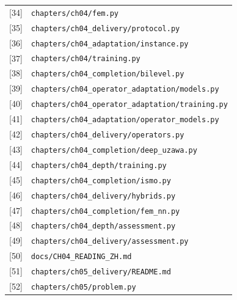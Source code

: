 \documentclass[a4paper,10pt]{article}
\begin{document}
\begin{longtable}{>{\raggedright\arraybackslash}p{}>{\raggedright\arraybackslash}p{}}
\leavevmode\hypertarget{source-34}{[34]} & \nolinkurl{chapters/ch04/fem.py} \\[2pt]
\leavevmode\hypertarget{source-35}{[35]} & \nolinkurl{chapters/ch04_delivery/protocol.py} \\[2pt]
\leavevmode\hypertarget{source-36}{[36]} & \nolinkurl{chapters/ch04_adaptation/instance.py} \\[2pt]
\leavevmode\hypertarget{source-37}{[37]} & \nolinkurl{chapters/ch04/training.py} \\[2pt]
\leavevmode\hypertarget{source-38}{[38]} & \nolinkurl{chapters/ch04_completion/bilevel.py} \\[2pt]
\leavevmode\hypertarget{source-39}{[39]} & \nolinkurl{chapters/ch04_operator_adaptation/models.py} \\[2pt]
\leavevmode\hypertarget{source-40}{[40]} & \nolinkurl{chapters/ch04_operator_adaptation/training.py} \\[2pt]
\leavevmode\hypertarget{source-41}{[41]} & \nolinkurl{chapters/ch04_adaptation/operator_models.py} \\[2pt]
\leavevmode\hypertarget{source-42}{[42]} & \nolinkurl{chapters/ch04_delivery/operators.py} \\[2pt]
\leavevmode\hypertarget{source-43}{[43]} & \nolinkurl{chapters/ch04_completion/deep_uzawa.py} \\[2pt]
\leavevmode\hypertarget{source-44}{[44]} & \nolinkurl{chapters/ch04_depth/training.py} \\[2pt]
\leavevmode\hypertarget{source-45}{[45]} & \nolinkurl{chapters/ch04_completion/ismo.py} \\[2pt]
\leavevmode\hypertarget{source-46}{[46]} & \nolinkurl{chapters/ch04_delivery/hybrids.py} \\[2pt]
\leavevmode\hypertarget{source-47}{[47]} & \nolinkurl{chapters/ch04_completion/fem_nn.py} \\[2pt]
\leavevmode\hypertarget{source-48}{[48]} & \nolinkurl{chapters/ch04_depth/assessment.py} \\[2pt]
\leavevmode\hypertarget{source-49}{[49]} & \nolinkurl{chapters/ch04_delivery/assessment.py} \\[2pt]
\leavevmode\hypertarget{source-50}{[50]} & \nolinkurl{docs/CH04_READING_ZH.md} \\[2pt]
\leavevmode\hypertarget{source-51}{[51]} & \nolinkurl{chapters/ch05_delivery/README.md} \\[2pt]
\leavevmode\hypertarget{source-52}{[52]} & \nolinkurl{chapters/ch05/problem.py} \\[2pt]

\end{longtable}
\end{document}
